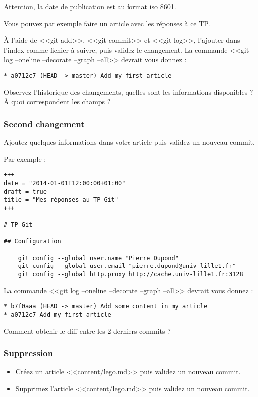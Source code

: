\documentclass[a4paper]{article}
\begin{document}
Attention, la date de publication est au format iso 8601.

Vous pouvez par exemple faire un article avec les réponses à ce TP.

À l'aide de <<git add>>, <<git commit>> et <<git log>>, l'ajouter dans l'index comme fichier à suivre, puis validez le changement. 
La commande <<git log --oneline --decorate --graph --all>> devrait vous donnez :
\begin{verbatim}
* a0712c7 (HEAD -> master) Add my first article
\end{verbatim}

Observez l'historique des changements, quelles sont les informations disponibles ? À quoi correspondent les champs ?

\subsubsection{Second changement}
Ajoutez quelques informations dans votre article puis validez un nouveau commit.

Par exemple : 
\begin{verbatim}
+++
date = "2014-01-01T12:00:00+01:00"
draft = true
title = "Mes réponses au TP Git"
+++

# TP Git

## Configuration

    git config --global user.name "Pierre Dupond"
    git config --global user.email "pierre.dupond@univ-lille1.fr"
    git config --global http.proxy http://cache.univ-lille1.fr:3128

\end{verbatim}

La commande <<git log --oneline --decorate --graph --all>> devrait vous donnez :
\begin{verbatim}
* b7f0aaa (HEAD -> master) Add some content in my article
* a0712c7 Add my first article
\end{verbatim}

Comment obtenir le diff entre les 2 derniers commits ?

\subsubsection{Suppression}
\begin{itemize}
\item Créez un article <<content/lego.md>> puis validez un nouveau commit. 
\item Supprimez l'article <<content/lego.md>> puis validez un nouveau commit. 
\end{itemize}
\end{document}
